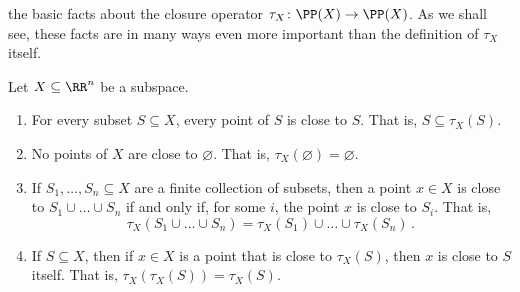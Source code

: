  the basic facts about the closure operator $\tau_X \colon \PP(X) \to \PP(X)$.
As we shall see, these facts are in many ways even more important than the definition of $\tau_X$ itself.
\begin{prp}%
\label{prp:key_properties_of_tau}
	Let $X \subseteq \RR^n $ be a subspace.
	\begin{enumerate}
		\item For every subset $S \subseteq X $, every point of $S$ is close to $S$.
			That is, $S \subseteq \tau_X(S)$.
		\item No points of $X$ are close to $\varnothing$.
			That is, $\tau_X(\varnothing) = \varnothing$.
		\item If $S_1,\dots,S_n \subseteq X$ are a finite collection of subsets, then a point $x \in X$ is close to $ S_1 \cup \dots \cup S_n $ if and only if, for some $i$, the point $x$ is close to $S_i$.
			That is,
			\[
				\tau_X\left(S_1 \cup \dots \cup S_n\right) = \tau_X(S_1) \cup \dots \cup \tau_X(S_n) \period
			\]
		\item If $S \subseteq X$, then if $x \in X$ is a point that is close to $\tau_X(S)$, then $x$ is close to $S$ itself.
			That is, $\tau_X(\tau_X(S)) = \tau_X(S)$.
	\end{enumerate}
\end{prp}


